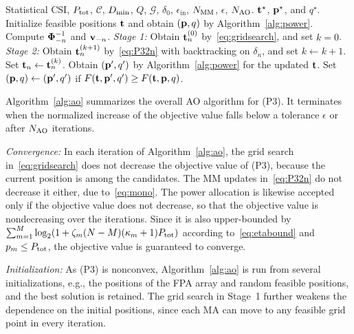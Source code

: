 \documentclass[journal]{IEEEtran}
\newcommand{\rev}[1]{{\color{red}#1}}
\newcommand{\rev}[1]{#1}
\begin{document}
\begin{algorithm}[t]
\caption{AO Algorithm for (P3)}\label{alg:ao}
\small\begin{algorithmic}[1]
\Require Statistical CSI, $P_{\mathrm{tot}}$, $\mathcal C$, $D_{\min}$, $Q$, $\mathcal G$, $\delta_0$, $\epsilon_{\mathrm{in}}$, $N_{\mathrm{MM}}$, $\epsilon$, $N_{\mathrm{AO}}$.
\Ensure $\mathbf{t}^\star$, $\mathbf{p}^\star$, and $q^\star$.
\State Initialize feasible positions $\mathbf{t}$ and obtain $(\mathbf{p},q)$ by Algorithm~\ref{alg:power}.
\Repeat
    \State Compute $\boldsymbol{\Phi}_{-n}^{-1}$ and $\mathbf{v}_{-n}$.
    \State \textit{Stage 1:} Obtain $\mathbf{t}_n^{(0)}$ by~\eqref{eq:gridsearch}, and set $k=0$.
    \Repeat
      \State \textit{Stage 2:} Obtain $\mathbf{t}_n^{(k+1)}$ by~\eqref{eq:P32n} with backtracking on $\delta_n$, and set $k\leftarrow k+1$.
    \State Set $\mathbf{t}_n\leftarrow\mathbf{t}_n^{(k)}$.
  \EndFor
  \State Obtain $(\mathbf{p}',q')$ by Algorithm~\ref{alg:power} for the updated $\mathbf{t}$.
  \State Set $(\mathbf{p},q)\leftarrow(\mathbf{p}',q')$ if $F(\mathbf{t},\mathbf{p}',q')\ge F(\mathbf{t},\mathbf{p},q)$.
\end{algorithmic}
\end{algorithm}

Algorithm~\ref{alg:ao} summarizes the overall AO algorithm for (P3)\rev{. It} terminates when the normalized increase of the objective value falls below a tolerance $\epsilon$ or after $N_{\mathrm{AO}}$ iterations.

\textit{Convergence:} In each iteration of Algorithm~\ref{alg:ao}, the grid search in~\eqref{eq:gridsearch} does not decrease the objective value of (P3), because the current position is among the candidates. The MM updates in~\eqref{eq:P32n} do not decrease it either, due to~\eqref{eq:mono}. The power allocation is likewise accepted only if the objective value does not decrease, so that the objective value is nondecreasing over the iterations. Since it is also upper-bounded by $\sum_{m=1}^M\log_2(1+\zeta_m(N-M)(\kappa_m+1)P_{\mathrm{tot}})$ according to~\eqref{eq:etabound} and $p_m\le P_{\mathrm{tot}}$, the objective value is guaranteed to converge.

\textit{Initialization:} As (P3) is nonconvex, Algorithm~\ref{alg:ao} is run from several initializations, e.g., the positions of the FPA array and random feasible positions, and the best solution is retained. The grid search in Stage~1 further weakens the dependence on the initial positions, since each MA can move to any feasible grid point in every iteration.
\end{document}
